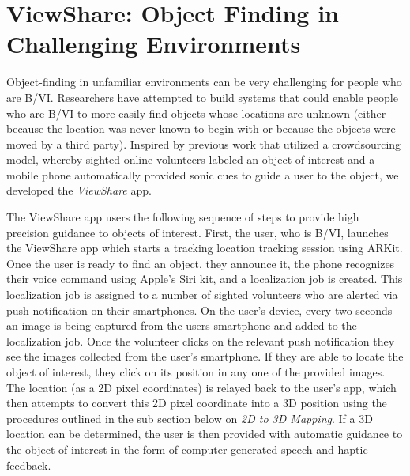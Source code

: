 \documentclass[chi_draft]{sigchi}
\newcommand{\BVI}{B/VI\xspace}
\begin{document}
\section{ViewShare: Object Finding in Challenging Environments}
Object-finding in unfamiliar environments can be very challenging for people who are \BVI {}.  Researchers have attempted to build systems that could enable people who are \BVI to more easily find objects whose locations are unknown (either because the location was never known to begin with or because the objects were moved by a third party).  Inspired by previous work \cite{bigham2010vizwizlocateit} that utilized a crowdsourcing model, whereby sighted online volunteers labeled an object of interest and a mobile phone automatically provided sonic cues to guide a user to the object, we developed the \emph{ViewShare} app.

The ViewShare app users the following sequence of steps to provide high precision guidance to objects of interest.  First, the user, who is \BVI, launches the ViewShare app which starts a tracking location tracking session using ARKit.  Once the user is ready to find an object, they announce it, the phone recognizes their voice command using Apple's Siri kit, and a localization job is created.  This localization job is assigned to a number of sighted volunteers who are alerted via push notification on their smartphones.  On the user's device, every two seconds an image is being captured from the users smartphone and added to the localization job.  Once the volunteer clicks on the relevant push notification they see the images collected from the user's smartphone.  If they are able to locate the object of interest, they click on its position in any one of the provided images.  The location (as a 2D pixel coordinates) is relayed back to the user's app, which then attempts to convert this 2D pixel coordinate into a 3D position using the procedures outlined in the sub section below on \emph{2D to 3D Mapping}.  If a 3D location can be determined, the user is then provided with automatic guidance to the object of interest in the form of computer-generated speech and haptic feedback.
\end{document}
